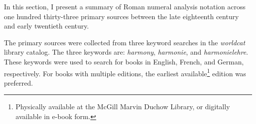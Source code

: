 

In this section, I present a summary of Roman numeral
analysis notation across one hundred thirty-three primary
sources between the late eighteenth century and early
twentieth century.

The primary sources were collected from three keyword
searches in the \emph{worldcat} library catalog. The three
keywords are: \emph{harmony}, \emph{harmonie}, and
\emph{harmonielehre}. These keywords were used to search for
books in English, French, and German, respectively. For
books with multiple editions, the earliest
available\footnote{Physically available at the McGill Marvin
Duchow Library, or digitally available in e-book form.}
edition was preferred.

